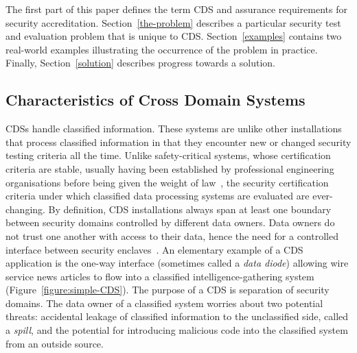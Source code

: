 \documentclass[10pt,letterpaper,conference,compsocconf]{IEEEtran}
\begin{document}
The first part of this paper defines the term CDS and assurance
requirements for security accreditation.  Section~\ref{the-problem} describes
a particular security test and evaluation problem that is unique to CDS.
Section~\ref{examples} contains two real-world examples illustrating the
occurrence of the problem in practice.  Finally, Section~\ref{solution}
describes progress towards a solution.

\subsection{Characteristics of Cross Domain Systems}

CDSs handle classified information.  These systems are unlike other
installations that process classified information in that they encounter new or
changed security testing criteria all the time.
Unlike safety-critical systems, whose certification criteria are stable,
usually having been established by professional engineering organisations before
being given the weight of law~\cite{Leveson1994,Leveson1995,DO-178B,FAA8110.49-2003},
the security certification criteria under which classified data processing
systems are evaluated are ever-changing.
By definition, CDS installations always span at least one boundary between
security domains controlled by different data owners.  Data owners
do not trust one another with access to their data, hence the
need for a controlled interface between security enclaves~\cite{DCID-6/3a}.
An elementary
example of a CDS application is the one-way interface (sometimes called a
{\it data diode}) allowing wire
service news articles to flow into a classified intelligence-gathering
system (Figure~\ref{figure:simple-CDS}).
The purpose of a CDS is separation of security domains.  The
data owner of a classified system worries about two
potential threats: accidental leakage of classified information to
the unclassified side, called a {\it spill}, and the potential for
introducing malicious
code into the classified system from an outside source.

%
%
\end{document}
